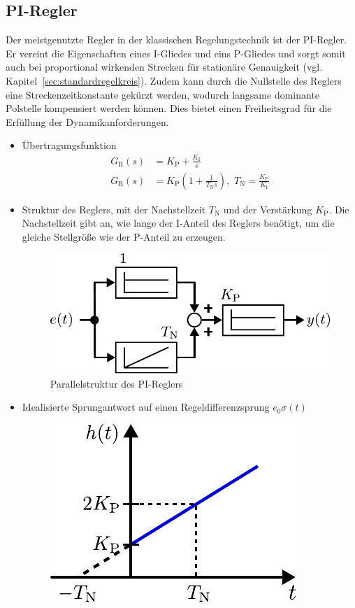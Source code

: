 \subsection{PI-Regler}
%
Der meistgenutzte Regler in der klassischen Regelungstechnik ist der PI-Regler. Er vereint die Eigenschaften eines I-Gliedes und eins P-Gliedes und sorgt somit auch bei proportional wirkenden Strecken für stationäre Genauigkeit (vgl. Kapitel~\ref{sec:standardregelkreis}). Zudem kann durch die Nullstelle des Reglers eine Streckenzeitkonstante gekürzt werden, wodurch langsame dominante Polstelle kompensiert werden können. Dies bietet einen Freiheitsgrad für die Erfüllung der Dynamikanforderungen.
%
\begin{itemize}
	\item Übertragungsfunktion
	\begin{equation*}
	\begin{aligned}
	G_{\text{R}}(s)&=K_{\text{P}}+\frac{K_{\text{I}}}{s}\\
	G_{\text{R}}(s)&=K_{\text{P}}\left(1+\frac{1}{T_{\text{N}}s}\right),\,\, T_{\text{N}}=\frac{K_{\text{P}}}{K_{\text{I}}}
	\end{aligned}
	\end{equation*}
	\item Struktur des Reglers, mit der Nachstellzeit $T_{\text{N}}$ und der Verstärkung $K_{\text{P}}$. Die Nachstellzeit gibt an, wie lange der I-Anteil des Reglers benötigt, um die gleiche Stellgröße wie der P-Anteil zu erzeugen.
	\begin{figure}[h]
		\centering
		\includegraphics[width=0.5\linewidth]{Abbildungen/Reglerentwurf/PDF/PIReglerStruktur.pdf}
		\caption{Parallelstruktur des PI-Reglers}
	\end{figure}
	\item Idealisierte Sprungantwort auf einen Regeldifferenzsprung $e_{0}\sigma(t)$
	\begin{figure}[h]
		\centering
		\includegraphics[width=0.375\linewidth]{Abbildungen/Reglerentwurf/PDF/PIReglerSprung.pdf}

\end{figure}
\end{itemize}
